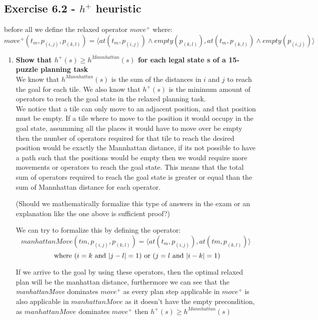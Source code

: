 \documentclass[12pt,a4paper]{article}
\begin{document}
	\subsection*{Exercise 6.2 - $h^+$ heuristic}
	before all we define the relaxed operator  $move^+$ where:
	\[ 
		move^+(t_m,p_{(i,j)},p_{(k,l)})=\langle 
			at(t_m,p_{(i,j)}) \land empty(p_{(k,l)}),
			at(t_m,p_{(k,l)}) \land empty(p_{(i,j)})
			\rangle
	\]
	\begin{enumerate}[label=(\alph*), listparindent=1.5em]
		\item \textbf{Show that $h^+(s) \geq h^{Mannhattan}(s)$ for 
		each legal state s of a 15-puzzle planning task}\\
			We know that $h^{Mannhattan}(s)$ is the sum of the
			distances in $i$ and $j$ to reach the goal for each tile.
			We also know that $h^+(s)$ is the minimum amount of operators
			to reach the goal state in the relaxed planning task. \\
			We 
			notice that a tile can only move to an adjacent position, 
			and that position must be empty. If a tile where to move
			to the position it would occupy in the goal state,
			assumming all the places it would have to move over
			be empty then the number of operators required for
			that tile to reach the desired position would 
			be exactly the Mannhattan distance, if its not possible
			to have a path such that the positions would be 
			empty then we would require more movements or operators
			to reach the goal state. This means that the total sum
			of operators required to reach the goal state is greater
			or equal than the sum of Mannhattan distance for each
			operator.

			\hfill\break
			(Should we mathematically formalize this type of 
			answers in the exam or an explanation like the one
			above is sufficient proof?)

			\hfill\break
			We can try to formalize this by defining the operator: 
			\[manhattanMove(tm, p_{(i,j)}, p_{(k,l)}) = \langle at(t_m, p_{(i,j)}), at(tm,p_{(k,l)})\rangle\]
			\[\text{ where } (i = k \text{ and } \abs{j - l} = 1)  \text{ or }  (j = l \text{ and } \abs{i - k}= 1) \]

			If we arrive to the goal by using these operators, then the optimal relaxed plan will be 
			the manhattan distance, furthermore we can see that the \emph{manhattanMove} dominates $move^+$
			as every plan step applicable in $move^+$ is also applicable in $manhattanMove$ as it doesn't
			have the empty precondition, as $manhattanMove$ dominates $move^+$ then
			$h^+(s) \geq h^{Mannhattan}(s)$



\end{enumerate}
\end{document}
